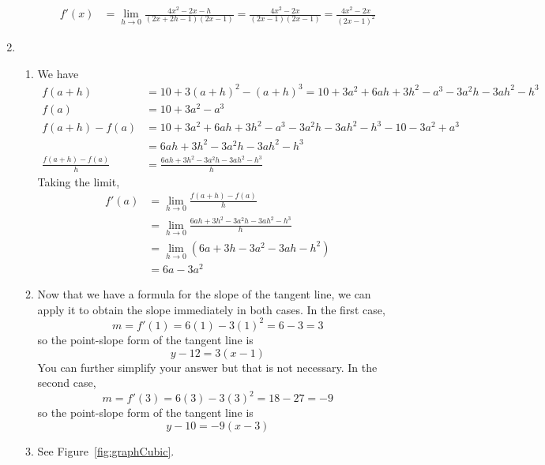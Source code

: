 \documentclass{article}
\begin{document}
\begin{enumerate}
\begin{enumerate}
\begin{align*}
      f'(x) &= \lim_{h\to 0} \frac{4x^2 - 2x - h}{(2x+2h-1)(2x-1)}
      = \frac{4x^2 - 2x}{(2x-1)(2x-1)} = \frac{4x^2-2x}{(2x-1)^2}
    \end{align*}
  \end{enumerate}
\item %
  \begin{enumerate}
  \item We have
    \begin{align*}
      f(a+h) &= 10 + 3(a+h)^2 - (a+h)^3 = 10 + 3a^2 + 6ah + 3h^2
               - a^3 - 3a^2h - 3ah^2 - h^3 \\
      f(a) &= 10 + 3a^2 - a^3 \\
      f(a+h)-f(a) &= 10 + 3a^2 + 6ah + 3h^2
                    - a^3 - 3a^2h - 3ah^2 - h^3 - 10 - 3a^2 + a^3 \\
             &= 6ah + 3h^2 - 3a^2h - 3ah^2 - h^3 \\
      \frac{f(a+h)-f(a)}{h} &= \frac{6ah+3h^2-3a^2h-3ah^2-h^3}{h}
    \end{align*}
    Taking the limit,
    \begin{align*}
      f'(a) &= \lim_{h\to 0} \frac{f(a+h)-f(a)}{h} \\
            &= \lim_{h\to 0} \frac{6ah+3h^2-3a^2h-3ah^2-h^3}{h} \\
            &= \lim_{h\to 0} (6a + 3h - 3a^2 - 3ah - h^2) \\
            &= 6a - 3a^2
    \end{align*}
  \item Now that we have a formula for the slope of the tangent line,
    we can apply it to obtain the slope immediately in both cases.  In
    the first case,
    \begin{displaymath}
      m = f'(1) = 6(1) - 3(1)^2 = 6 - 3 = 3
    \end{displaymath}
    so the point-slope form of the tangent line is
    \begin{displaymath}
      y - 12 = 3(x-1)
    \end{displaymath}
    You can further simplify your answer but that is not necessary.
    In the second case,
    \begin{displaymath}
      m = f'(3) = 6(3) - 3(3)^2 = 18 - 27 = -9
    \end{displaymath}
    so the point-slope form of the tangent line is
    \begin{displaymath}
      y - 10 = -9(x-3)
    \end{displaymath}
  \item See Figure~\ref{fig:graphCubic}.

\end{enumerate}
\end{enumerate}
\end{document}
